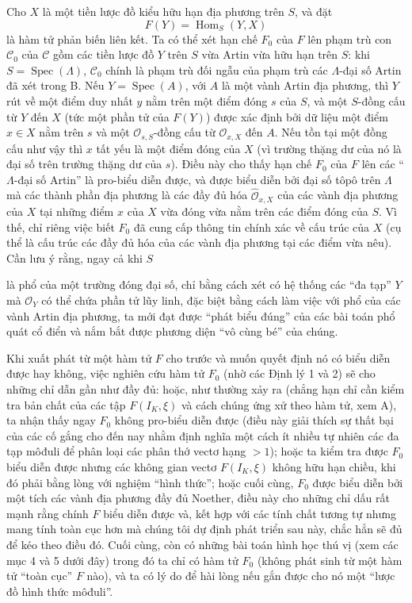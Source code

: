 Cho $X$ là một tiền lược đồ kiểu hữu hạn địa phương trên $S$, và đặt
\[
  F(Y)=\operatorname{Hom}_S(Y,X)
\]
là hàm tử phản biến liên kết. Ta có thể xét hạn chế $F_0$ của $F$ lên phạm trù
con $\mathcal C_0$ của $\mathcal C$ gồm các tiền lược đồ $Y$ trên $S$ vừa
Artin vừa hữu hạn trên $S$: khi $S=\operatorname{Spec}(\Lambda)$,
$\mathcal C_0$ chính là phạm trù đối ngẫu của phạm trù các $\Lambda$-đại số
Artin đã xét trong B. Nếu $Y=\operatorname{Spec}(A)$, với $A$ là một vành
Artin địa phương, thì $Y$ rút về một điểm duy nhất $y$ nằm trên một điểm đóng
$s$ của $S$, và một $S$-đồng cấu từ $Y$ đến $X$ (tức một phần tử của $F(Y)$)
được xác định bởi dữ liệu một điểm $x\in X$ nằm trên $s$ và một
$\mathcal O_{s,S}$-đồng cấu từ $\mathcal O_{x,X}$ đến $A$. Nếu tồn tại một
đồng cấu như vậy thì $x$ tất yếu là một điểm đóng của $X$ (vì trường thặng dư
của nó là đại số trên trường thặng dư của $s$). Điều này cho thấy hạn chế
$F_0$ của $F$ lên các ``$\Lambda$-đại số Artin'' là pro-biểu diễn được, và
được biểu diễn bởi đại số tôpô trên $\Lambda$ mà các thành phần địa phương là
các đầy đủ hóa $\widehat{\mathcal O}_{x,X}$ của các vành địa phương của $X$
tại những điểm $x$ của $X$ vừa đóng vừa nằm trên các điểm đóng của $S$. Vì
thế, chỉ riêng việc biết $F_0$ đã cung cấp thông tin chính xác về cấu trúc của
$X$ (cụ thể là cấu trúc các đầy đủ hóa của các vành địa phương tại các điểm
vừa nêu). Cần lưu ý rằng, ngay cả khi $S$

là phổ của một trường đóng đại số, chỉ bằng cách xét có hệ thống các ``đa
tạp'' $Y$ mà $\mathcal O_Y$ có thể chứa phần tử lũy linh, đặc biệt bằng cách
làm việc với phổ của các vành Artin địa phương, ta mới đạt được ``phát biểu
đúng'' của các bài toán phổ quát cổ điển và nắm bắt được phương diện ``vô cùng
bé'' của chúng.

Khi xuất phát từ một hàm tử $F$ cho trước và muốn quyết định nó có biểu diễn
được hay không, việc nghiên cứu hàm tử $F_0$ (nhờ các Định lý 1 và 2) sẽ cho
những chỉ dẫn gần như đầy đủ: hoặc, như thường xảy ra (chẳng hạn chỉ cần kiểm
tra bản chất của các tập $F(I_K,\xi)$ và cách chúng ứng xử theo hàm tử, xem A),
ta nhận thấy ngay $F_0$ không pro-biểu diễn được (điều này giải thích sự thất
bại của các cố gắng cho đến nay nhằm định nghĩa một cách ít nhiều tự nhiên
các đa tạp môđuli để phân loại các phân thớ vectơ hạng $>1$); hoặc ta kiểm tra
được $F_0$ biểu diễn được nhưng các không gian vectơ $F(I_K,\xi)$ không hữu
hạn chiều, khi đó phải bằng lòng với nghiệm ``hình thức''; hoặc cuối cùng,
$F_0$ được biểu diễn bởi một tích các vành địa phương đầy đủ Noether, điều này
cho những chỉ dấu rất mạnh rằng chính $F$ biểu diễn được và, kết hợp với các
tính chất tương tự nhưng mang tính toàn cục hơn mà chúng tôi dự định phát
triển sau này, chắc hẳn sẽ đủ để kéo theo điều đó. Cuối cùng, còn có những bài
toán hình học thú vị (xem các mục 4 và 5 dưới đây) trong đó ta chỉ có hàm tử
$F_0$ (không phát sinh từ một hàm tử ``toàn cục'' $F$ nào), và ta có lý do để
hài lòng nếu gắn được cho nó một ``lược đồ hình thức môđuli''.

